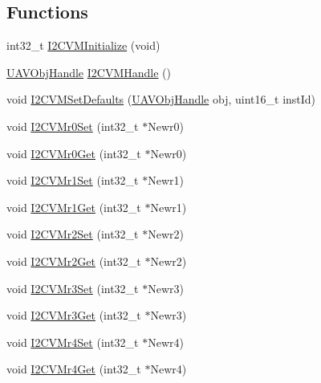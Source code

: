 \subsection*{\-Functions}
\begin{DoxyCompactItemize}
\item 
int32\-\_\-t \hyperlink{group___i2_c_v_m_ga969f6946940316eb305b09a8d3a664af}{\-I2\-C\-V\-M\-Initialize} (void)
\item 
\hyperlink{targets_2_u_a_v_objects_2inc_2uavobjectmanager_8h_a279053e22be53ce9f895043aaeb91e3b}{\-U\-A\-V\-Obj\-Handle} \hyperlink{group___i2_c_v_m_ga9de75c81bcfaa8f63aadab7d29f8056a}{\-I2\-C\-V\-M\-Handle} ()
\item 
void \hyperlink{group___i2_c_v_m_ga182fae307d5c616b55dea813fabfda37}{\-I2\-C\-V\-M\-Set\-Defaults} (\hyperlink{targets_2_u_a_v_objects_2inc_2uavobjectmanager_8h_a279053e22be53ce9f895043aaeb91e3b}{\-U\-A\-V\-Obj\-Handle} obj, uint16\-\_\-t inst\-Id)
\item 
void \hyperlink{group___i2_c_v_m_gaaf254c34bbf2bd84405dc98379559c77}{\-I2\-C\-V\-Mr0\-Set} (int32\-\_\-t $\ast$\-Newr0)
\item 
void \hyperlink{group___i2_c_v_m_gab4590e2d96466f06361107f71fcde531}{\-I2\-C\-V\-Mr0\-Get} (int32\-\_\-t $\ast$\-Newr0)
\item 
void \hyperlink{group___i2_c_v_m_ga9eb97df778a08ab0db92180adf9477a9}{\-I2\-C\-V\-Mr1\-Set} (int32\-\_\-t $\ast$\-Newr1)
\item 
void \hyperlink{group___i2_c_v_m_gaa34e9ce81d515c6ba0e9a0edefc7cf84}{\-I2\-C\-V\-Mr1\-Get} (int32\-\_\-t $\ast$\-Newr1)
\item 
void \hyperlink{group___i2_c_v_m_ga307aa2f64dbf51b6e9136feaa0fe28ad}{\-I2\-C\-V\-Mr2\-Set} (int32\-\_\-t $\ast$\-Newr2)
\item 
void \hyperlink{group___i2_c_v_m_ga013e59a5c52faf448dda46c75b77b3e6}{\-I2\-C\-V\-Mr2\-Get} (int32\-\_\-t $\ast$\-Newr2)
\item 
void \hyperlink{group___i2_c_v_m_ga9c7d7817907e0148dd99d39087f19dc0}{\-I2\-C\-V\-Mr3\-Set} (int32\-\_\-t $\ast$\-Newr3)
\item 
void \hyperlink{group___i2_c_v_m_gaabe61dee38d9d4be97a8f19025580cf4}{\-I2\-C\-V\-Mr3\-Get} (int32\-\_\-t $\ast$\-Newr3)
\item 
void \hyperlink{group___i2_c_v_m_gadfc21f1d2a59035ba639e67677d21dae}{\-I2\-C\-V\-Mr4\-Set} (int32\-\_\-t $\ast$\-Newr4)
\item 
void \hyperlink{group___i2_c_v_m_gae989d6c6c9c0b96edb63be9f441e1f60}{\-I2\-C\-V\-Mr4\-Get} (int32\-\_\-t $\ast$\-Newr4)

\end{DoxyCompactItemize}
